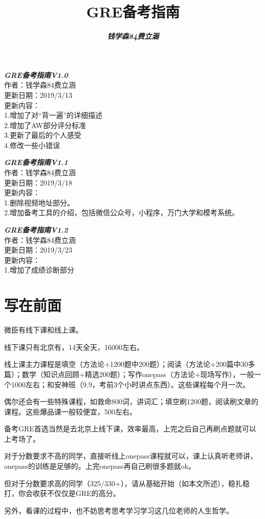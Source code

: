 \documentclass[11pt,a4paper]{article}
\title{\bfseries\Huge GRE备考指南}
\author{\bfseries\slshape 钱学森84费立涵}
\begin{document}
	\maketitle
	\newpage
	\textbf{\LARGE\slshape GRE备考指南V1.0}
	\large{\\作者：钱学森84费立涵
	\\更新日期：2019/3/13
	\\更新内容：
	\\1.增加了对“背一遍”的详细描述
	\\2.增加了AW部分评分标准
	\\3.更新了最后的个人感受
	\\4.修改一些小错误}
	
	\vspace{24pt} 
	\textbf{\LARGE\slshape GRE备考指南V1.1}
	\large{\\作者：钱学森84费立涵
	\\更新日期：2019/3/18
	\\更新内容：
	\\1.删除视频地址部分。
	\\2.增加备考工具的介绍，包括微信公众号，小程序，万门大学和模考系统。}
	
	\vspace{24pt} 
	\large{\textbf{\LARGE\slshape GRE备考指南V1.2}
	\\作者：钱学森84费立涵
	\\更新日期：2019/3/23
	\\更新内容：
	\\1.增加了成绩诊断部分} 
	
	\newpage
	\tableofcontents
	\newpage
	
	\part{写在前面}
	微臣有线下课和线上课。
	\par 线下课只有北京有，14天全天，16000左右。
	\par 线上课主力课程是填空（方法论+1200题中200题）；阅读（方法论+200篇中30多篇）；数学（知识点回顾+精选200题）；写作onepass（方法论+现场写作），一般一个1000左右；和安神班（9.9，考前3个小时讲点东西）。这些课程每个月一次。
	\par 偶尔还会有一些特殊课程，如救命800词，讲词汇；填空刷1200题，阅读刷文章的课程。这些爆品课一般较便宜，500左右。
	\par\vspace{11pt} 备考GRE首选当然是去北京上线下课，效率最高，上完之后自己再刷点题就可以上考场了。
	\par 对于分数要求不高的同学，直接听线上onepass课程就可以，课上认真听老师讲，onepass的训练是足够的。上完onepass再自己刷很多题就ok。
	\par 但对于分数要求高的同学（325/330+），请从基础开始（如本文所述），稳扎稳打，你会收获不仅仅是GRE的高分。
	\par\vspace{11pt}另外，看课的过程中，也不妨思考思考学习学习这几位老师的人生哲学。
	
\end{document}
